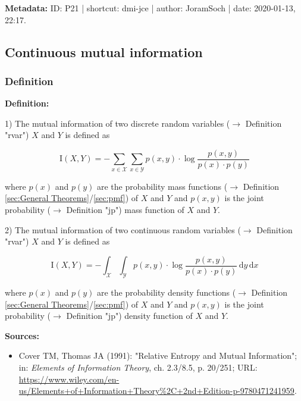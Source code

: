 \documentclass[a4paper,12pt]{book}
\begin{document}
\vspace{1em}
\textbf{Metadata:} ID: P21 | shortcut: dmi-jce | author: JoramSoch | date: 2020-01-13, 22:17.


\subsection{Continuous mutual information}

\subsubsection[\textit{Definition}]{Definition} \label{sec:mi}

\vspace{1em}
\textbf{Definition:}

1) The mutual information of two discrete random variables ($\rightarrow$ Definition "rvar") $X$ and $Y$ is defined as

\begin{equation} \label{eq:mi-mi-disc}
\mathrm{I}(X,Y) = - \sum_{x \in \mathcal{X}} \sum_{x \in \mathcal{Y}} p(x,y) \cdot \log \frac{p(x,y)}{p(x) \cdot p(y)}
\end{equation}

where $p(x)$ and $p(y)$ are the probability mass functions ($\rightarrow$ Definition \ref{sec:General Theorems}/\ref{sec:pmf}) of $X$ and $Y$ and $p(x,y)$ is the joint probability ($\rightarrow$ Definition "jp") mass function of $X$ and $Y$.

2) The mutual information of two continuous random variables ($\rightarrow$ Definition "rvar") $X$ and $Y$ is defined as

\begin{equation} \label{eq:mi-mi-cont}
\mathrm{I}(X,Y) = - \int_{\mathcal{X}} \int_{\mathcal{Y}} p(x,y) \cdot \log \frac{p(x,y)}{p(x) \cdot p(y)} \, \mathrm{d}y \, \mathrm{d}x
\end{equation}

where $p(x)$ and $p(y)$ are the probability density functions ($\rightarrow$ Definition \ref{sec:General Theorems}/\ref{sec:pmf}) of $X$ and $Y$ and $p(x,y)$ is the joint probability ($\rightarrow$ Definition "jp") density function of $X$ and $Y$.

\vspace{1em}
\textbf{Sources:}
\begin{itemize}
\item Cover TM, Thomas JA (1991): "Relative Entropy and Mutual Information"; in: \textit{Elements of Information Theory}, ch. 2.3/8.5, p. 20/251; URL: \url{https://www.wiley.com/en-us/Elements+of+Information+Theory%2C+2nd+Edition-p-9780471241959}.
\end{itemize}
\end{document}
